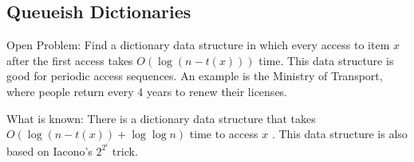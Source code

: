 \documentclass[12pt]{article}
\begin{document}
\subsection{Queueish Dictionaries}

Open Problem: Find a dictionary data structure in which every access
to item $x$ after the first access takes $O(\log (n-t(x)))$ time.
This data structure is good for periodic access sequences.  An example
is the Ministry of Transport, where people return every 4 years to
renew their licenses.

What is known: There is a dictionary data structure that takes $O(\log
(n-t(x)) + \log\log n)$ time to access $x$ \cite{il02}.  This data
structure is also based on Iacono's $2^{2^i}$ trick.



\end{document}
